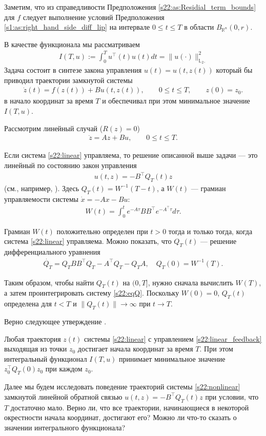 \documentclass[../main.tex]{subfiles}
\begin{document}
Заметим, что из справедливости Предположения \ref{s22:as:Residial_term_bounds} для $f$ следует выполнение условий Предположения \ref{s1:as:right_hand_side_diff_lip} на интервале $ 0 \leqslant t \leqslant T$ в области $B_{\mathbb{R}^n}(0,r)$.

В качестве функционала мы рассматриваем 
\begin{gather}\label{s22:cost}
 I(T,u):=\int_0^Tu^\top (t)u(t)dt= \lVert u(\cdot)\rVert^2_{\mathbb{L}_2.} 
\end{gather}
Задача состоит в синтезе закона управления $u(t)=u(t,z(t))$ который бы приводил траектории замкнутой системы 
\begin{gather*}
 \dot{z}(t)=f(z(t))+B u(t,z(t)),\qquad 0 \leqslant t \leqslant T, \qquad z(0) = z_0.
\end{gather*}
в начало координат за время $T$ и обеспечивал при этом минимальное значение $I(T,u)$. 

Рассмотрим линейный случай ($R(z)=0$)
\begin{gather}\label{s22:linear}
 \dot{z} = A z + B u, \qquad 0 \leqslant t \leqslant T.
\end{gather}

Если система \eqref{s22:linear} управляема, то решение описанной выше задачи --- это линейный по состоянию закон управления 
\begin{gather}\label{s22:linear_feedback}
 u(t,z) = -B^{\top} Q_T(t) z
\end{gather}
(см., например, \cite{Abgar,Kur1,GusevOsipov}).
Здесь $Q_T(t)=W^{-1}(T-t)$, а $W(t)$ --- грамиан управляемости системы $\dot{x} = -A x - B u$:
\begin{gather*}
 W(t) = \int_0^t e^{-A\tau}BB^\top e^{-A^{\top}\tau}d\tau. 
\end{gather*}

Грамиан $W(t)$ положительно определен при $t>0$ тогда и только тогда, когда 
система \eqref{s22:linear} управляема. 
Можно показать, что $Q_T(t)$ --- решение дифференциального уравнения 
\begin{gather}\label{s22:eqQ}
 \dot{Q_T} = Q_T B B^{\top} Q_T - A^{\top}Q_T - Q_T A, \quad Q_T(0)=W^{-1}(T).
\end{gather}

Таким образом, чтобы найти $Q_T(t)$ на $(0,T]$, нужно сначала вычислить $W(T)$, а затем проинтегрировать систему \eqref{s22:eqQ}.
Поскольку $W(0)=0$, $Q_T(t)$ определена для $t<T$ и $\|Q_T(t)\| \to \infty$ при $t\to T$. 

Верно следующее утверждение \cite{Abgar,Kur1,GusevOsipov}.
\begin{utv}
Любая траектория $z(t)$ системы \eqref{s22:linear} с управлением \eqref{s22:linear_feedback} выходящая из точки $ z_0 $ достигает начала координат за время $T$. 
При этом интегральный функционал $I(T,u)$ принимает минимальное значение $z^{\top}_0 Q_T(0) z_0 $ при каждом $z_0$.
\end{utv}
Далее мы будем исследовать поведение траекторий системы \eqref{s22:nonlinear} замкнутой линейной обратной связью $ u(t,z) = -B^{\top} Q_T(t) z$ при условии, что $T$ достаточно мало. 
Верно ли, что все траектории, начинающиеся в некоторой окрестности начала координат, достигают его? 
Можно ли что-то сказать о значении интегрального функционала? 
\end{document}
